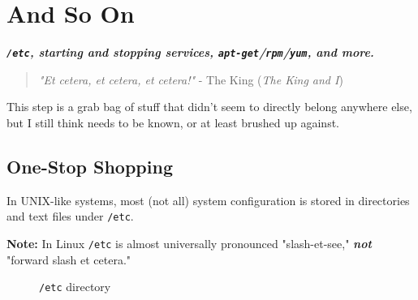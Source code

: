 \documentclass[10pt,american,]{book}
\numberwithin{figure}{chapter}
\DeclareRobustCommand{\drcap}[1]{\begin{figure}[H]\caption{#1}\end{figure}}
\begin{document}
\hypertarget{and-so-on}{\chapter{And So On}\label{and-so-on}}

\textbf{\emph{\texttt{/etc}, starting and stopping services,
\texttt{apt-get}/\texttt{rpm}/\texttt{yum}, and more.}}

\begin{quote}
\emph{"Et cetera, et cetera, et cetera!"} - The King (\emph{The King and
I})
\end{quote}

This step is a grab bag of stuff that didn't seem to directly belong
anywhere else, but I still think needs to be known, or at least brushed
up against.

\section*{One-Stop Shopping}\label{one-stop-shopping}

In UNIX-like systems, most (not all) system configuration is stored in
directories and text files under
\texttt{/etc}.

\textbf{Note:} In Linux \texttt{/etc} is almost universally pronounced
"slash-et-see," \textbf{\emph{not}} "forward slash et cetera."

\drcap{\texttt{/etc} directory}
\end{document}
